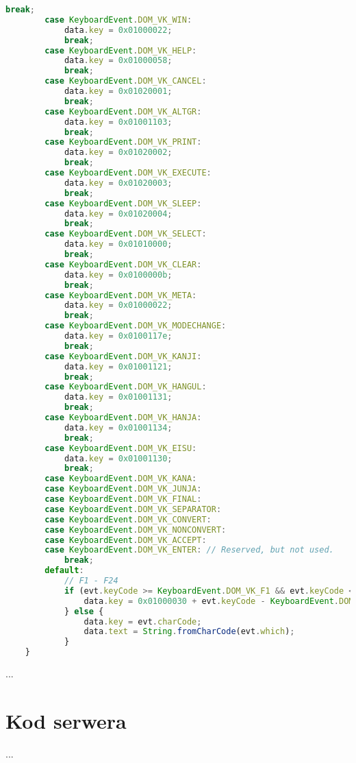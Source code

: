 \begin{lstlisting}[language=JavaScript,numbers=none,caption=Fragment metody translacji kodów klawiatury]
            break;
        case KeyboardEvent.DOM_VK_WIN:
            data.key = 0x01000022;
            break;
        case KeyboardEvent.DOM_VK_HELP:
            data.key = 0x01000058;
            break;
        case KeyboardEvent.DOM_VK_CANCEL:
            data.key = 0x01020001;
            break;
        case KeyboardEvent.DOM_VK_ALTGR:
            data.key = 0x01001103;
            break;
        case KeyboardEvent.DOM_VK_PRINT:
            data.key = 0x01020002;
            break;
        case KeyboardEvent.DOM_VK_EXECUTE:
            data.key = 0x01020003;
            break;
        case KeyboardEvent.DOM_VK_SLEEP:
            data.key = 0x01020004;
            break;
        case KeyboardEvent.DOM_VK_SELECT:
            data.key = 0x01010000;
            break;
        case KeyboardEvent.DOM_VK_CLEAR:
            data.key = 0x0100000b;
            break;
        case KeyboardEvent.DOM_VK_META:
            data.key = 0x01000022;
            break;
        case KeyboardEvent.DOM_VK_MODECHANGE:
            data.key = 0x0100117e;
            break;
        case KeyboardEvent.DOM_VK_KANJI:
            data.key = 0x01001121;
            break;
        case KeyboardEvent.DOM_VK_HANGUL:
            data.key = 0x01001131;
            break;
        case KeyboardEvent.DOM_VK_HANJA:
            data.key = 0x01001134;
            break;
        case KeyboardEvent.DOM_VK_EISU:
            data.key = 0x01001130;
            break;
        case KeyboardEvent.DOM_VK_KANA:
        case KeyboardEvent.DOM_VK_JUNJA:
        case KeyboardEvent.DOM_VK_FINAL:
        case KeyboardEvent.DOM_VK_SEPARATOR:
        case KeyboardEvent.DOM_VK_CONVERT:
        case KeyboardEvent.DOM_VK_NONCONVERT:
        case KeyboardEvent.DOM_VK_ACCEPT:
        case KeyboardEvent.DOM_VK_ENTER: // Reserved, but not used.
            break;
        default:
            // F1 - F24
            if (evt.keyCode >= KeyboardEvent.DOM_VK_F1 && evt.keyCode <= KeyboardEvent.DOM_VK_F24) {
                data.key = 0x01000030 + evt.keyCode - KeyboardEvent.DOM_VK_F1;
            } else {
                data.key = evt.charCode;
                data.text = String.fromCharCode(evt.which);
            }
    }
\end{lstlisting}
...

\section{Kod serwera}

...